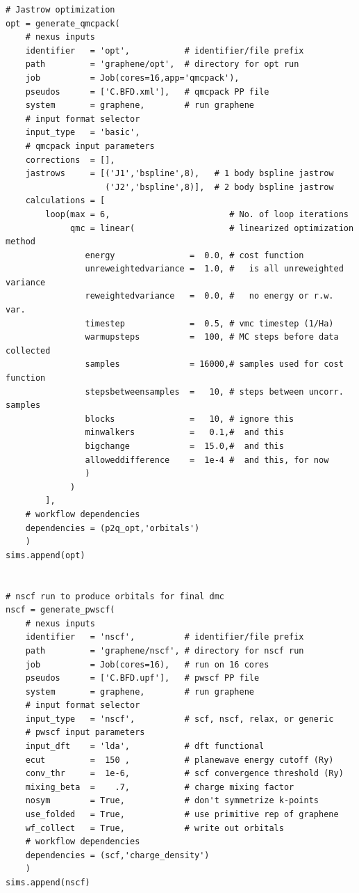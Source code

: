 \documentclass[oneside,11pt]{memoir}
\numberwithin{equation}{section}
\begin{document}
\begin{verbatim}
# Jastrow optimization
opt = generate_qmcpack(
    # nexus inputs
    identifier   = 'opt',           # identifier/file prefix
    path         = 'graphene/opt',  # directory for opt run
    job          = Job(cores=16,app='qmcpack'),
    pseudos      = ['C.BFD.xml'],   # qmcpack PP file
    system       = graphene,        # run graphene
    # input format selector   
    input_type   = 'basic',
    # qmcpack input parameters
    corrections  = [], 
    jastrows     = [('J1','bspline',8),   # 1 body bspline jastrow
                    ('J2','bspline',8)],  # 2 body bspline jastrow
    calculations = [
        loop(max = 6,                        # No. of loop iterations
             qmc = linear(                   # linearized optimization method
                energy               =  0.0, # cost function
                unreweightedvariance =  1.0, #   is all unreweighted variance
                reweightedvariance   =  0.0, #   no energy or r.w. var. 
                timestep             =  0.5, # vmc timestep (1/Ha)
                warmupsteps          =  100, # MC steps before data collected 
                samples              = 16000,# samples used for cost function 
                stepsbetweensamples  =   10, # steps between uncorr. samples
                blocks               =   10, # ignore this  
                minwalkers           =   0.1,#  and this
                bigchange            =  15.0,#  and this
                alloweddifference    =  1e-4 #  and this, for now
                )
             )        
        ],
    # workflow dependencies
    dependencies = (p2q_opt,'orbitals')        
    )
sims.append(opt)


# nscf run to produce orbitals for final dmc
nscf = generate_pwscf(
    # nexus inputs
    identifier   = 'nscf',          # identifier/file prefix      
    path         = 'graphene/nscf', # directory for nscf run       
    job          = Job(cores=16),   # run on 16 cores             
    pseudos      = ['C.BFD.upf'],   # pwscf PP file               
    system       = graphene,        # run graphene                
    # input format selector                                      
    input_type   = 'nscf',          # scf, nscf, relax, or generic
    # pwscf input parameters
    input_dft    = 'lda',           # dft functional
    ecut         =  150 ,           # planewave energy cutoff (Ry)
    conv_thr     =  1e-6,           # scf convergence threshold (Ry)
    mixing_beta  =    .7,           # charge mixing factor
    nosym        = True,            # don't symmetrize k-points
    use_folded   = True,            # use primitive rep of graphene
    wf_collect   = True,            # write out orbitals
    # workflow dependencies
    dependencies = (scf,'charge_density')
    )
sims.append(nscf)


\end{verbatim}
\end{document}
